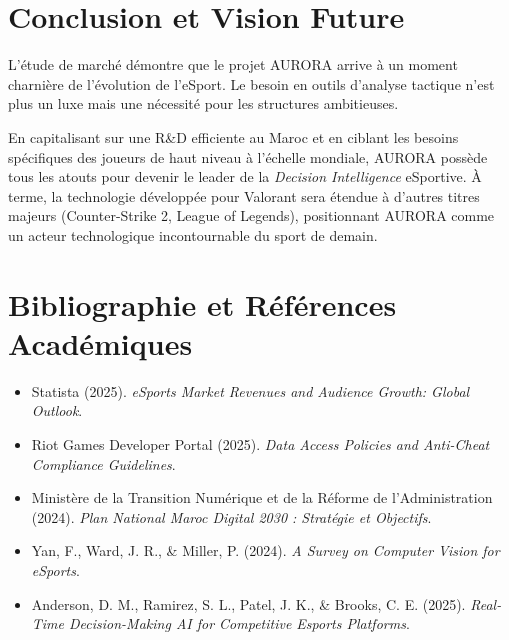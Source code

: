 \documentclass[a4paper,11pt]{article}
\begin{document}
\section{Conclusion et Vision Future}
L'étude de marché démontre que le projet AURORA arrive à un moment charnière de l'évolution de l'eSport. Le besoin en outils d'analyse tactique n'est plus un luxe mais une nécessité pour les structures ambitieuses. 

En capitalisant sur une R\&D efficiente au Maroc et en ciblant les besoins spécifiques des joueurs de haut niveau à l'échelle mondiale, AURORA possède tous les atouts pour devenir le leader de la \textit{Decision Intelligence} eSportive. À terme, la technologie développée pour Valorant sera étendue à d'autres titres majeurs (Counter-Strike 2, League of Legends), positionnant AURORA comme un acteur technologique incontournable du sport de demain.

\newpage
\section*{Bibliographie et Références Académiques}
\begin{itemize}[label=--]
    \item Statista (2025). \textit{eSports Market Revenues and Audience Growth: Global Outlook}.
    \item Riot Games Developer Portal (2025). \textit{Data Access Policies and Anti-Cheat Compliance Guidelines}.
    \item Ministère de la Transition Numérique et de la Réforme de l'Administration (2024). \textit{Plan National Maroc Digital 2030 : Stratégie et Objectifs}.
    \item Yan, F., Ward, J. R., \& Miller, P. (2024). \textit{A Survey on Computer Vision for eSports}.
    \item Anderson, D. M., Ramirez, S. L., Patel, J. K., \& Brooks, C. E. (2025). \textit{Real-Time Decision-Making AI for Competitive Esports Platforms}.
\end{itemize}
\end{document}
